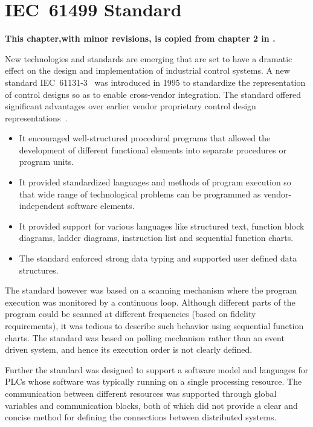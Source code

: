 \chapter{IEC~61499 Standard}
\label{functionblocks}

\textbf{This chapter,with minor revisions, is copied from
  chapter 2 in \cite{j:des:2002}.}

New technologies and standards are emerging that are set to
have a dramatic effect on the design and implementation of
industrial control systems. A new standard
IEC~61131-3~\cite{iec:1131:1993} was introduced in 1995 to
standardize the representation of control designs so as to
enable cross-vendor integration. The standard offered
significant advantages over earlier vendor proprietary
control design representations~\cite{l:pro:1995}.
\begin{itemize}
\item It encouraged well-structured procedural programs that
  allowed the development of different functional elements
  into separate procedures or program units.
\item It provided standardized languages and methods of
  program execution so that wide range of technological
  problems can be programmed as vendor-independent software
  elements.
\item It provided support for various languages like
  structured text, function block diagrams, ladder diagrams,
  instruction list and sequential function charts.
\item The standard enforced strong data typing and supported
  user defined data structures.
\end{itemize}

The standard however was based on a scanning mechanism where
the program execution was monitored by a continuous loop.
Although different parts of the program could be scanned at
different frequencies (based on fidelity requirements), it
was tedious to describe such behavior using sequential
function charts. The standard was based on polling mechanism
rather than an event driven system, and hence its execution
order is not clearly defined.

Further the standard was designed to support a software
model and languages for PLCs whose software was typically
running on a single processing resource. The communication
between different resources was supported through global
variables and communication blocks, both of which did not
provide a clear and concise method for defining the
connections between distributed systems.

